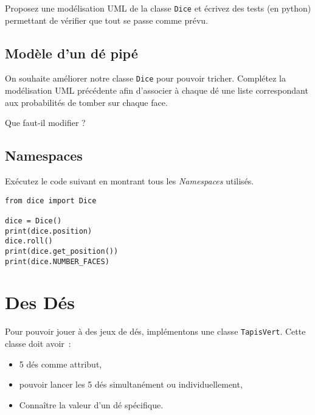 \documentclass[12pt]{article}
\begin{document}
Proposez une modélisation UML de la classe \verb|Dice| et écrivez des tests (en python) permettant de vérifier que tout se passe comme prévu.

\subsection{Modèle d'un dé pipé}

On souhaite améliorer notre classe \verb|Dice| pour pouvoir tricher. Complétez la modélisation UML précédente afin d'associer à chaque dé une liste correspondant aux probabilités de tomber sur chaque face.

Que faut-il modifier ?


\subsection{Namespaces}

Exécutez le code suivant en montrant tous les {\em Namespaces} utilisés.

\lstset{language=Python}
\begin{lstlisting}
from dice import Dice

dice = Dice()
print(dice.position)
dice.roll()
print(dice.get_position())
print(dice.NUMBER_FACES)
\end{lstlisting}

\section{Des Dés}

Pour pouvoir jouer à des jeux de dés, implémentons une classe \verb|TapisVert|. Cette classe doit avoir~:
\begin{itemize}
	\item 5 dés comme attribut,
	\item pouvoir lancer les 5 dés simultanément ou individuellement,
	\item Connaître la valeur d'un dé spécifique.
\end{itemize}
\end{document}
